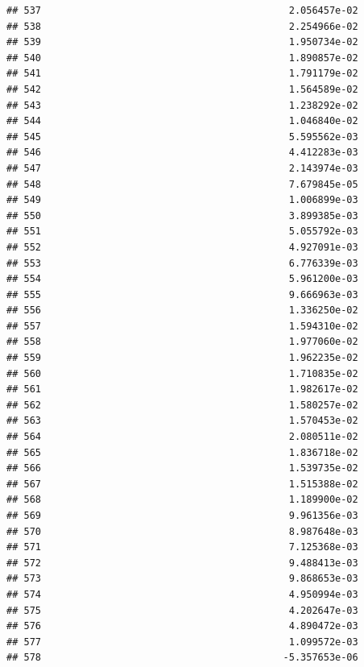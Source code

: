 \documentclass[
]{article}
\begin{document}
\begin{verbatim}
## 537                                           2.056457e-02
## 538                                           2.254966e-02
## 539                                           1.950734e-02
## 540                                           1.890857e-02
## 541                                           1.791179e-02
## 542                                           1.564589e-02
## 543                                           1.238292e-02
## 544                                           1.046840e-02
## 545                                           5.595562e-03
## 546                                           4.412283e-03
## 547                                           2.143974e-03
## 548                                           7.679845e-05
## 549                                           1.006899e-03
## 550                                           3.899385e-03
## 551                                           5.055792e-03
## 552                                           4.927091e-03
## 553                                           6.776339e-03
## 554                                           5.961200e-03
## 555                                           9.666963e-03
## 556                                           1.336250e-02
## 557                                           1.594310e-02
## 558                                           1.977060e-02
## 559                                           1.962235e-02
## 560                                           1.710835e-02
## 561                                           1.982617e-02
## 562                                           1.580257e-02
## 563                                           1.570453e-02
## 564                                           2.080511e-02
## 565                                           1.836718e-02
## 566                                           1.539735e-02
## 567                                           1.515388e-02
## 568                                           1.189900e-02
## 569                                           9.961356e-03
## 570                                           8.987648e-03
## 571                                           7.125368e-03
## 572                                           9.488413e-03
## 573                                           9.868653e-03
## 574                                           4.950994e-03
## 575                                           4.202647e-03
## 576                                           4.890472e-03
## 577                                           1.099572e-03
## 578                                          -5.357653e-06

\end{verbatim}
\end{document}
